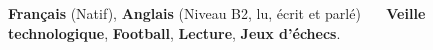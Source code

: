 

\begin{cventries}

\renewcommand{\labelitemi}{}
\begin{cvitems2} %
    \small
    \renewcommand{\labelitemi}{}
    \item {\textbf{Français} (Natif), \textbf{Anglais} (Niveau B2, lu, \'ecrit et parlé) \textbf{~\vert~}  \textbf{Veille technologique}, \textbf{Football}, \textbf{Lecture}, \textbf{Jeux d'échecs}.}
\end{cvitems2}
\end{cventries}

\vspace{3mm} %





